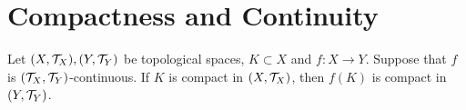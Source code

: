 \documentclass{book}
\begin{document}
 
 
 
 
 
 
 
 
 
 
 
 
 
 
 
 
 
 
 
 
 
 
 
 
 
 
 
 
 
 
 
 
 \section{Compactness and Continuity}
 
 \begin{ex} 
 	Let $(X, \mathcal{T}_X), (Y, \mathcal{T}_Y)$ be topological spaces, $K \subset X$ and $f: X \rightarrow Y$. Suppose that $f$ is $(\mathcal{T}_X, \mathcal{T}_Y)$-continuous. If $K$ is compact in $(X, \mathcal{T}_X)$, then $f(K)$ is compact in $(Y, \mathcal{T}_Y)$.
 \end{ex}
\end{document}
